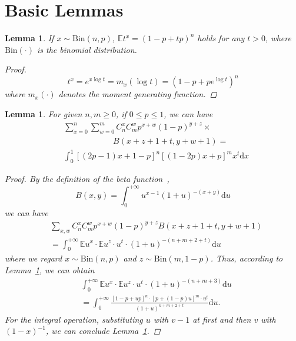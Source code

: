 \documentclass{article}
\newtheorem{lemma}[theorem]{Lemma}
\begin{document}
\section{Basic Lemmas}
\begin{lemma}
\label{MoGene}
If $x\sim \mathrm{Bin}(n,p)$, $\mathbb{E}t^x= \left(1-p+tp\right)^{n}$ holds for any $t>0$, where $\mathrm{Bin}(\cdot)$ is the binomial distribution.
\begin{proof}
\begin{equation}
t^x = e^{x\log t}=m_x(\log t)= \left(1-p+pe^{\log t}\right)^{n}
\end{equation}
where $m_x(\cdot)$ denotes the moment generating function.
\end{proof}
\end{lemma}

\begin{lemma}
\label{SolveF}
For given $n,m\geq 0$, if $0\leq p\leq 1$, we can have
\begin{equation*}
\begin{split}
&{\sum}_{x=0}^{n}{\sum}_{w=0}^{m} C_{n}^{x}C_{m}^{w}p^{x+w}(1-p)^{y+z}\times\\
&\qquad\qquad\qquad B(x+z+1+t,y+w+1)=\\
&\int_{0}^{1}[(2p-1)x+1-p]^{n}[(1-2p)x+p]^{m}x^{t}\mathrm{d}x
\end{split}
\end{equation*}
\begin{proof}
By the definition of the beta function~\cite{olver2010nist},
\begin{equation}
B(x, y) = \int_{0}^{+\infty} u^{x-1}(1+u)^{-(x+y)}\mathrm{d}u
\end{equation}
we can have
\begin{align}
&\sum_{x,w} C_{n}^{x}C_{m}^{w}p^{x+w}(1-p)^{y+z}B(x+z+1+t,y+w+1)\nonumber\\
&= \int_{0}^{+\infty} \mathbb{E}u^{x}\cdot\mathbb{E}u^z \cdot u^t\cdot (1+u)^{-(n+m+2+t)}\mathrm{d}u
\end{align}
where we regard $x\sim \mathrm{Bin}(n,p)$ and $z\sim \mathrm{Bin}(m,1-p)$.
Thus, according to Lemma~\ref{MoGene}, we can obtain
\begin{equation}
\begin{split}
&\int_{0}^{+\infty} \mathbb{E}u^{x}\cdot\mathbb{E}u^z \cdot u^t\cdot (1+u)^{-(n+m+3)}\mathrm{d}u\\
&=\int_{0}^{+\infty} \frac{[1-p+up]^n\cdot [p+(1-p)u]^m\cdot u^t}{(1+u)^{n+m+2+t}}\mathrm{d}u.
\end{split}
\end{equation}
For the integral operation, substituting $u$ with $v-1$ at first and then $v$ with $(1-x)^{-1}$, we can conclude Lemma~\ref{SolveF}.
\end{proof}
\end{lemma}
\end{document}

